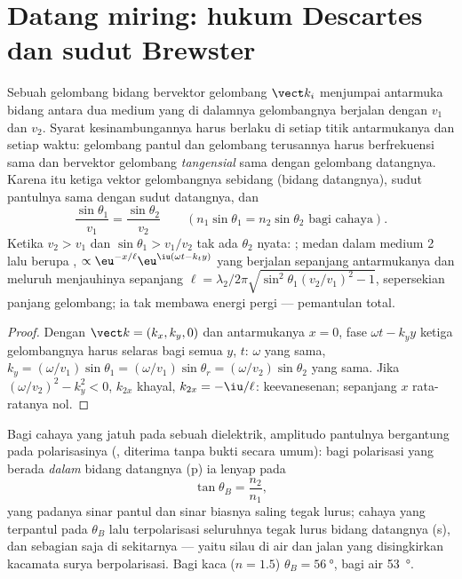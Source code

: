 \section{Datang miring: hukum Descartes dan sudut Brewster}

\begin{theorem}\label{thm:b2:wave-interfaces:snell}
Sebuah gelombang bidang bervektor gelombang $\vect k_i$ menjumpai antarmuka bidang antara
dua medium yang di dalamnya gelombangnya berjalan dengan $v_1$ dan $v_2$. Syarat
kesinambungannya harus berlaku di setiap titik antarmukanya dan setiap waktu:
gelombang pantul dan gelombang terusannya harus berfrekuensi sama dan
bervektor gelombang \emph{tangensial} sama dengan gelombang datangnya. Karena itu
ketiga vektor gelombangnya sebidang (bidang datangnya), sudut
pantulnya sama dengan sudut datangnya, dan
\[
\frac{\sin\theta_1}{v_1} = \frac{\sin\theta_2}{v_2} \qquad (n_1\sin\theta_1 = n_2\sin\theta_2 \text{ bagi cahaya}) .
\]
Ketika $v_2 > v_1$ dan $\sin\theta_1 > v_1/v_2$ tak ada $\theta_2$ nyata:
\emph{}; medan dalam medium 2 lalu berupa
\emph{}, $\propto\eu^{-x/\ell}\eu^{\iu(\omega t - k_ty)}$ yang berjalan
sepanjang antarmukanya dan meluruh menjauhinya sepanjang $\ell = \lambda_2/2\pi
\sqrt{\sin^2\theta_1(v_2/v_1)^2 - 1}$, sepersekian panjang gelombang; ia
tak membawa energi pergi --- pemantulan total.
\end{theorem}

\begin{proof}
Dengan $\vect k = (k_x, k_y, 0)$ dan antarmukanya $x = 0$, fase
$\omega t - k_yy$ ketiga gelombangnya harus selaras bagi semua $y$, $t$: $\omega$
yang sama, $k_y = (\omega/v_1)\sin\theta_1 = (\omega/v_1)\sin\theta_r = (\omega/v_2)\sin
\theta_2$ yang sama. Jika $(\omega/v_2)^2 - k_y^2 < 0$, $k_{2x}$ khayal, $k_{2x} = -\iu/\ell$:
keevanesenan;  sepanjang $x$ rata-ratanya nol.
\end{proof}

\begin{proposition}\label{prop:b2:wave-interfaces:brewster}
Bagi cahaya yang jatuh pada sebuah dielektrik, amplitudo pantulnya bergantung pada
polarisasinya (, diterima tanpa bukti secara umum): bagi
polarisasi yang berada \emph{dalam} bidang datangnya (p) ia lenyap pada
\emph{}
\[
\tan\theta_B = \frac{n_2}{n_1} ,
\]
yang padanya sinar pantul dan sinar biasnya saling tegak lurus; cahaya
yang terpantul pada $\theta_B$ lalu terpolarisasi seluruhnya tegak lurus
bidang datangnya (s), dan sebagian saja di sekitarnya --- yaitu silau di
air dan jalan yang disingkirkan kacamata surya berpolarisasi. Bagi kaca ($n = 1.5$)
$\theta_B = \qty{56}{\degree}$, bagi air \qty{53}{\degree}.
\end{proposition}

